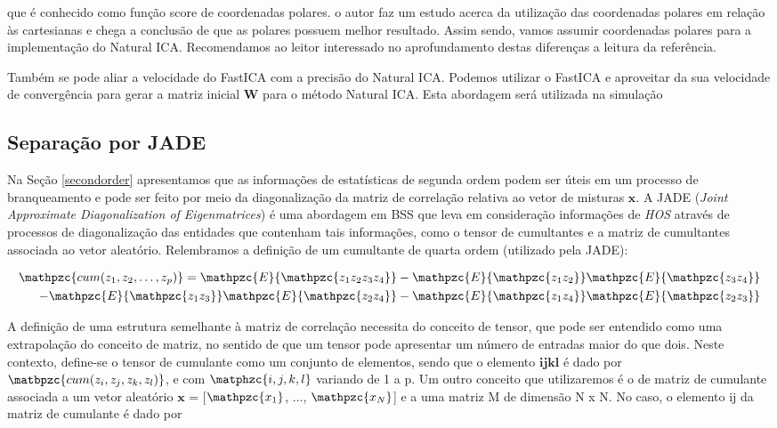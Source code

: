         que é conhecido como função score de coordenadas polares. o autor \cite{LuizVictorio} faz um estudo acerca da utilização das coordenadas polares em relação às cartesianas e chega a conclusão de que as polares possuem melhor resultado. Assim sendo, vamos assumir coordenadas polares para a implementação do Natural ICA. Recomendamos ao leitor interessado no aprofundamento destas diferenças a leitura da referência.
        
        Também se pode aliar a velocidade do FastICA com a precisão do Natural ICA. Podemos utilizar o FastICA e aproveitar da sua velocidade de convergência para gerar a matriz inicial $\mathbf{W}$ para o método Natural ICA. Esta abordagem será utilizada na simulação
    
 
    \subsection{Separação por JADE}
        Na Seção \ref{secondorder} apresentamos que as informações de estatísticas de segunda ordem podem ser úteis em um processo de branqueamento e pode ser feito por meio da diagonalização da matriz de correlação relativa ao vetor de misturas $\mathbf{x}$. A JADE (\textit{Joint Approximate Diagonalization of Eigenmatrices})\cite{JADE} é uma abordagem em BSS que leva em consideração informações de \textit{HOS} através de processos de diagonalização das entidades que contenham tais informações, como o tensor de cumultantes e a matriz de cumultantes associada ao vetor aleatório. Relembramos a definição de um cumultante de quarta ordem (utilizado pela JADE):
    
    \begin{equation}
        \label{cumJADE}
        \begin{split}
        \mathpzc{cum(z_1,z_2,\dots,z_p)} = \mathpzc{E}\{\mathpzc{z_1z_2z_3z_4}\} - \mathpzc{E}\{\mathpzc{z_1z_2}\}\mathpzc{E}\{\mathpzc{z_3z_4}\} & \\ - \mathpzc{E}\{\mathpzc{z_1z_3}\}\mathpzc{E}\{\mathpzc{z_2z_4}\} - \mathpzc{E}\{\mathpzc{z_1z_4}\}\mathpzc{E}\{\mathpzc{z_2z_3}\}    
        \end{split}
    \end{equation}
    
    A definição de uma estrutura semelhante à matriz de correlação necessita do conceito de tensor, que pode ser entendido como uma extrapolação do conceito de matriz, no sentido de que um tensor pode apresentar um número de  entradas maior do que dois. Neste contexto, define-se o tensor de cumulante como um conjunto de elementos, sendo que o elemento $\mathbf{ijkl}$ é dado por $\matbpzc{cum(z_i, z_j, z_k, z_l)}$, e com $\matphzc{i,j,k,l}$ variando de 1 a p.
    Um outro conceito que utilizaremos é o de matriz de cumulante associada a um vetor aleatório $\mathbf{x}$ = [$\mathpzc{x_1}$, $\dots$,  $\mathpzc{x_N}$] e a uma matriz M de dimensão N x N. No caso, o elemento ij da matriz de cumulante é dado por
    
